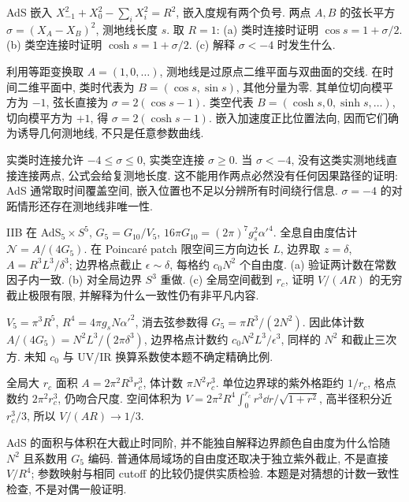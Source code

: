\begin{exercise}
AdS 嵌入 $X_{-1}^2+X_0^2-\sum_iX_i^2=R^2$, 嵌入度规有两个负号. 两点 $A,B$ 的弦长平方 $\sigma=(X_A-X_B)^2$, 测地线长度 $s$.
取 $R=1$:
(a) 类时连接时证明 $\cos s=1+\sigma/2$.
(b) 类空连接时证明 $\cosh s=1+\sigma/2$.
(c) 解释 $\sigma<-4$ 时发生什么.
\end{exercise}
\begin{solution}
利用等距变换取 $A=(1,0,\ldots)$, 测地线是过原点二维平面与双曲面的交线. 在时间二维平面中, 类时代表为 $B=(\cos s,\sin s)$, 其他分量为零. 其单位切向模平方为 $-1$, 弦长直接为 $\sigma=2(\cos s-1)$. 类空代表 $B=(\cosh s,0,\sinh s,\ldots)$, 切向模平方为 $+1$, 得 $\sigma=2(\cosh s-1)$. 嵌入加速度正比位置法向, 因而它们确为诱导几何测地线, 不只是任意参数曲线.

实类时连接允许 $-4\le\sigma\le0$, 实类空连接 $\sigma\ge0$. 当 $\sigma<-4$, 没有这类实测地线直接连接两点, 公式会给复测地长度. 这不能用作两点必然没有任何因果路径的证明: AdS 通常取时间覆盖空间, 嵌入位置也不足以分辨所有时间绕行信息. $\sigma=-4$ 的对跖情形还存在测地线非唯一性.
\end{solution}

\begin{exercise}
IIB 在 AdS$_5\times S^5$, $G_5=G_{10}/V_5$, $16\pi G_{10}=(2\pi)^7g_s^2\alpha'^4$. 全息自由度估计 $\mathcal N=A/(4G_5)$.
在 Poincaré patch 限空间三方向边长 $L$, 边界取 $z=\delta$, $A=R^3L^3/\delta^3$; 边界格点截止 $\epsilon\sim\delta$, 每格约 $c_0N^2$ 个自由度.
(a) 验证两计数在常数因子内一致.
(b) 对全局边界 $S^3$ 重做.
(c) 全局空间截到 $r_c$, 证明 $V/(AR)$ 的无穷截止极限有限, 并解释为什么一致性仍有非平凡内容.
\end{exercise}
\begin{solution}
$V_5=\pi^3R^5$, $R^4=4\pi g_sN\alpha'^2$, 消去弦参数得 $G_5=\pi R^3/(2N^2)$. 因此体计数 $A/(4G_5)=N^2L^3/(2\pi\delta^3)$, 边界格点计数约 $c_0N^2L^3/\epsilon^3$, 同样的 $N^2$ 和截止三次方. 未知 $c_0$ 与 UV/IR 换算系数使本题不确定精确比例.

全局大 $r_c$ 面积 $A=2\pi^2R^3r_c^3$, 体计数 $\pi N^2r_c^3$. 单位边界球的紫外格距约 $1/r_c$, 格点数约 $2\pi^2r_c^3$, 仍吻合尺度. 空间体积为 $V=2\pi^2R^4\int_0^{r_c}r^3\dd r/\sqrt{1+r^2}$, 高半径积分近 $r_c^3/3$, 所以 $V/(AR)\to1/3$.

AdS 的面积与体积在大截止时同阶, 并不能独自解释边界颜色自由度为什么恰随 $N^2$ 且系数用 $G_5$ 编码. 普通体局域场的自由度还取决于独立紫外截止, 不是直接 $V/R^4$; 参数映射与相同 cutoff 的比较仍提供实质检验. 本题是对猜想的计数一致性检查, 不是对偶一般证明.
\end{solution}

